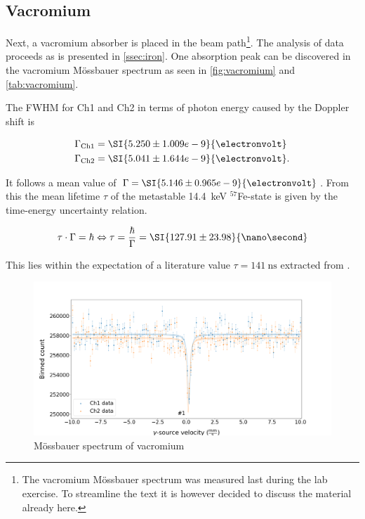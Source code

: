 
\subsection{Vacromium}
\label{ssec:vacromium}

Next, a vacromium absorber is placed in the beam path\footnote{The vacromium
Mössbauer spectrum was measured last during the lab exercise. To streamline the text
it is however decided to discuss the material already here.}. The analysis of data
proceeds as is presented in \autoref{ssec:iron}. One absorption peak can be
discovered in the vacromium Mössbauer spectrum as seen in \autoref{fig:vacromium} and
\autoref{tab:vacromium}.

The FWHM for Ch1 and Ch2 in terms of photon energy caused by the Doppler shift is 

\begin{align*}
\Gamma_\text{Ch1} &= \SI{5.250\pm1.009e-9}{\electronvolt} \\
\Gamma_\text{Ch2} &= \SI{5.041\pm1.644e-9}{\electronvolt}.
\end{align*}

It follows a mean value of $\Gamma = \SI{5.146\pm0.965e-9}{\electronvolt}$. From
this the mean lifetime $\tau$ of the metastable \SI{14.4}{\kilo\electronvolt} 
$^{57}$Fe-state is given by the time-energy uncertainty relation.

\begin{equation}
\label{eq:tau-iron}
\tau\cdot\Gamma = \hbar \Leftrightarrow \tau = \frac{\hbar}{\Gamma} = \SI{127.91\pm23.98}{\nano\second}
\end{equation}

This lies within the expectation of a literature value $\tau=\SI{141}{\nano\second}$ 
extracted from \cite{nishida1981moessbauer}.

\begin{figure}
	\centering
	\includegraphics[width=1.0\textwidth]{./fig/Vacromium.png}
	\caption{Mössbauer spectrum of vacromium}
	\label{fig:vacromium}
\end{figure}


